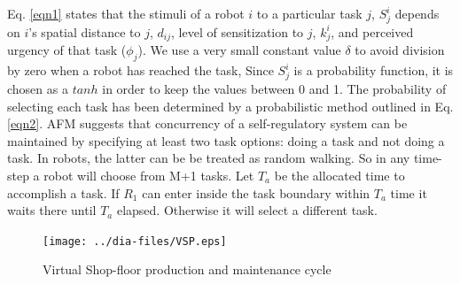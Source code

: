 \documentclass{llncs}
\begin{document}
Eq. \ref{eqn1} states that the stimuli of a robot $i$ to a particular task $j$, $S_{j}^{i}$ depends on $i$'s spatial distance to $j$, $d_{ij}$, level of sensitization to $j$, $k_{j}^{i}$, and perceived urgency of that task ($\phi _{j}$). We use a very small constant value $\delta$ to avoid division by zero when a robot has reached the task, Since $S_{j}^{i}$ is a probability function, it is chosen as a $tanh$ in order
to keep the values between 0 and 1. The probability of selecting each task has been determined by a probabilistic method outlined in Eq. \ref{eqn2}.
AFM suggests that concurrency of a self-regulatory system can be maintained by specifying at least two task options: doing a task and not doing a task. In robots, the latter can be be treated as random walking. So in any time-step a robot will choose from M+1 tasks. Let $T_a$ be the allocated time to accomplish a task. If $R_1$ can enter inside the task boundary within $T_a$ time it waits there until $T_a$ elapsed. Otherwise it will select a different task.
\begin{figure}
\centering
\texttt{[image: ../dia-files/VSP.eps]}
\caption{\small Virtual Shop-floor production and maintenance cycle}
\label{fig:vsp}  %
\end{figure}
\end{document}
